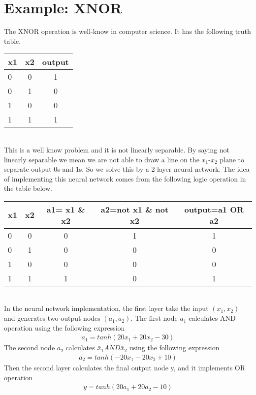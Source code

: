 \documentclass[a4paper]{article}
\begin{document}
\section{Example: XNOR}
The XNOR operation is well-know in computer science. It has the following truth table.\\
\begin{tabular}{ l | c | c }
x1 & x2 & output \\
\hline
0  &  0 & 1 \\
0  &  1 & 0 \\
1  &  0 & 0 \\
1  &  1 & 1 \\
\end{tabular}\\
This is a well know problem and it is not linearly separable. By saying not linearly separable we mean we are not able to draw a line on the $x_1$-$x_2$ plane to separate output 0s and 1s. So we solve this by a 2-layer neural network. The idea of implementing this neural network comes from the following logic operation in the table below. \\
\begin{tabular}{ l | c | c |c | c}
x1 & x2 & a1= x1 \& x2 & a2=not x1 \& not x2 & output=a1 OR a2 \\
\hline
0  &  0 & 0 & 1 & 1 \\
0  &  1 & 0 & 0 & 0 \\
1  &  0 & 0 & 0 & 0 \\
1  &  1 & 1 & 0 & 1\\
\end{tabular}\\
In the neural network implementation, the first layer take the input $(x_1, x_2)$ and generates two output nodes $(a_1, a_2)$. The first node $a_1$ calculates AND operation using the following expression
\begin{align*}
	a_1 = tanh (20 x_1 + 20 x_2 - 30)
\end{align*}
The second node $a_2$ calculates $\bar x_1 AND \bar x_2$ using the following expression
\begin{align*}
	a_2 = tanh (-20 x_1 -20 x_2 + 10)
\end{align*}
Then the second layer calculates the final output node y, and it implements OR operation
\begin{align*}
	y = tanh (20 a_1 + 20 a_2 -10)
\end{align*}
\end{document}
